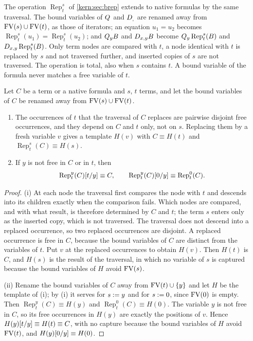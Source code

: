 The operation $\operatorname{Rep}_{t}^{s}$ of \cref{kern:sec:brep} extends
to native formulas by the same traversal.  The bound variables of $Q_{}$ and
$D_{,}$ are renamed away from $\operatorname{FV}(s)\cup\operatorname{FV}(t)$, as those of iterators; an
equation $u_1=u_2$ becomes
$\operatorname{Rep}_{t}^{s}(u_1)=\operatorname{Rep}_{t}^{s}(u_2)$; and
$Q_{y}B$ and $D_{x,y}B$ become $Q_{y}\operatorname{Rep}_{t}^{s}(B)$ and
$D_{x,y}\operatorname{Rep}_{t}^{s}(B)$.  Only term nodes are compared with
$t$, a node identical with $t$ is replaced by $s$ and not traversed further,
and inserted copies of $s$ are not traversed.  The operation is total, also
when $s$ contains $t$.  A bound variable of the formula never matches a free
variable of $t$.

\begin{lemma}[Abstraction]
\label{kern:lem:abstr}
Let $C$ be a term or a native formula and $s$, $t$ terms, and let the bound
variables of $C$ be renamed away from $\operatorname{FV}(s)\cup\operatorname{FV}(t)$.
\begin{enumerate}[label=\textup{(\roman*)}]
\item The occurrences of $t$ that the traversal of $C$ replaces are pairwise
 disjoint free occurrences, and they depend on $C$ and $t$ only, not on $s$.
 Replacing them by a fresh variable $v$ gives a template $H(v)$ with
 $C\equiv H(t)$ and $\operatorname{Rep}_{t}^{s}(C)\equiv H(s)$.
\item If $y$ is not free in $C$ or in $t$, then
 \[
  \operatorname{Rep}_{t}^{y}(C)[t/y]\equiv C,\qquad
  \operatorname{Rep}_{t}^{y}(C)[0/y]\equiv\operatorname{Rep}_{t}^{0}(C).
 \]
\end{enumerate}
\end{lemma}

\begin{proof}
(i) At each node the traversal first compares the node with $t$ and descends
into its children exactly when the comparison fails.  Which nodes are
compared, and with what result, is therefore determined by $C$ and $t$; the
term $s$ enters only as the inserted copy, which is not traversed.  The
traversal does not descend into a replaced occurrence, so two replaced
occurrences are disjoint.  A replaced occurrence is free in $C$, because the
bound variables of $C$ are distinct from the variables of $t$.  Put $v$ at
the replaced occurrences to obtain $H(v)$.  Then $H(t)$ is $C$, and $H(s)$
is the result of the traversal, in which no variable of $s$ is captured
because the bound variables of $H$ avoid $\operatorname{FV}(s)$.

(ii) Rename the bound variables of $C$ away from $\operatorname{FV}(t)\cup\{y\}$ and let
$H$ be the template of (i); by (i) it serves for $s\mathrel{:=} y$ and for
$s\mathrel{:=} 0$, since $\operatorname{FV}(0)$ is empty.  Then
$\operatorname{Rep}_{t}^{y}(C)\equiv H(y)$ and
$\operatorname{Rep}_{t}^{0}(C)\equiv H(0)$.  The variable $y$ is not free in
$C$, so its free occurrences in $H(y)$ are exactly the positions of $v$.
Hence $H(y)[t/y]\equiv H(t)\equiv C$, with no capture because the bound
variables of $H$ avoid $\operatorname{FV}(t)$, and $H(y)[0/y]\equiv H(0)$.
\end{proof}

